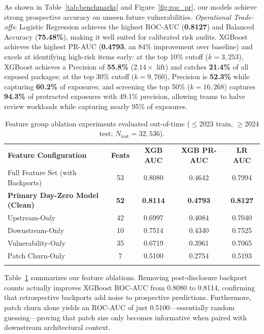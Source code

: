 \documentclass[graybox]{svmult}
\begin{document}
As shown in Table~\ref{tab:benchmarks} and Figure~\ref{fig:roc_pr}, our models achieve strong prospective accuracy on unseen future vulnerabilities. \textit{Operational Trade-offs}: Logistic Regression achieves the highest ROC-AUC (\textbf{0.8127}) and Balanced Accuracy (\textbf{75.48\%}), making it well suited for calibrated risk audits. XGBoost achieves the highest PR-AUC (\textbf{0.4793}, an 84\% improvement over baseline) and excels at identifying high-risk items early: at the top 10\% cutoff ($k = 3,253$), XGBoost achieves a Precision of \textbf{55.8\%} ($2.14\times$ lift) and catches \textbf{21.4\%} of all exposed packages; at the top 30\% cutoff ($k = 9,760$), Precision is \textbf{52.3\%} while capturing \textbf{60.2\%} of exposures; and screening the top 50\% ($k = 16,268$) captures \textbf{94.3\%} of protracted exposures with 49.1\% precision, allowing teams to halve review workloads while capturing nearly 95\% of exposures.

\begin{table}[htbp]
\caption{Feature group ablation experiments evaluated out-of-time ($\le$2023 train, $\ge$2024 test; $N_{\text{test}} = 32,536$).}
\label{tab:ablations}
\centering
\scriptsize
\begin{tabular}{lcccc}
\hline\noalign{\smallskip}
\textbf{Feature Configuration} & \textbf{Feats} & \textbf{XGB AUC} & \textbf{XGB PR-AUC} & \textbf{LR AUC} \\
\noalign{\smallskip}\svhline\noalign{\smallskip}
Full Feature Set (with Backports) & 53 & 0.8080 & 0.4642 & 0.7994 \\
\textbf{Primary Day-Zero Model (Clean)} & \textbf{52} & \textbf{0.8114} & \textbf{0.4793} & \textbf{0.8127} \\
Upstream-Only & 42 & 0.6997 & 0.4084 & 0.7040 \\
Downstream-Only & 10 & 0.7514 & 0.4340 & 0.7525 \\
Vulnerability-Only & 35 & 0.6719 & 0.3961 & 0.7065 \\
Patch Churn-Only & 7 & 0.5100 & 0.2754 & 0.5193 \\
\noalign{\smallskip}\hline
\end{tabular}
\end{table}

Table~\ref{tab:ablations} summarizes our feature ablations. Removing post-disclosure backport counts actually improves XGBoost ROC-AUC from 0.8080 to 0.8114, confirming that retrospective backports add noise to prospective predictions. Furthermore, patch churn alone yields an ROC-AUC of just 0.5100---essentially random guessing---proving that patch size only becomes informative when paired with downstream architectural context.
\end{document}
